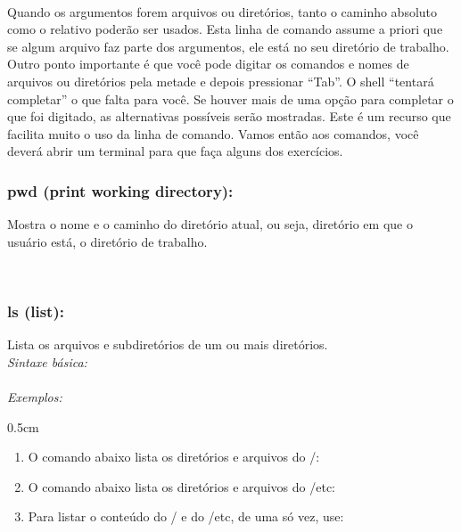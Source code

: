 \begin{refsection}
\\

 Quando os argumentos forem arquivos ou diretórios, tanto o caminho absoluto como o relativo poderão ser usados. Esta linha de comando assume a priori que se algum arquivo faz parte dos argumentos, ele está no seu diretório de trabalho.\\
Outro ponto importante é que você pode digitar os comandos e nomes de arquivos ou diretórios pela metade e depois pressionar ``Tab''. O shell ``tentará completar'' o que falta para você. Se houver mais de uma opção para completar o que foi digitado, as alternativas possíveis serão mostradas. Este é um recurso que facilita muito o uso da linha de comando. Vamos então aos comandos, você deverá abrir um terminal para que faça alguns dos exercícios.\\

\subsubsection{pwd (print working directory):}\label{tut1:text_mode:commands:pwd}
 Mostra o nome e o caminho do diretório atual, ou seja, diretório em que o usuário está, o diretório de trabalho.\\

\\
\subsubsection{ls (list):}\label{tut1:text_mode:commands:ls}
 Lista os arquivos e subdiretórios de um ou mais diretórios.\\
 \textit{Sintaxe básica:}\\
\\
 \textit{Exemplos:}
\begin {myindentpar}{0.5cm}
\begin{enumerate}[\itshape i.]
  \item {O comando abaixo lista os diretórios e arquivos do /:}\\

  \item {O comando abaixo lista os diretórios e arquivos do /etc:}\\

   \item {Para listar o conteúdo do / e do /etc, de uma só vez, use:}\\
\\


\end{enumerate}
\end{myindentpar}
\end{refsection}
